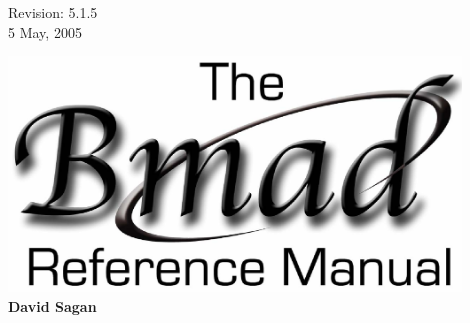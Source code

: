 \thispagestyle{empty}

\begin{flushright}
\large
  Revision: 5.1.5 \\
  5 May, 2005 \\
\end{flushright}

\vfill

{
\begin{center}
\includegraphics[width=12cm]{bmad_ref_manual.eps} \\
\vskip 0.3in
\huge\bf David Sagan
\end{center}
}

\vfill
\break